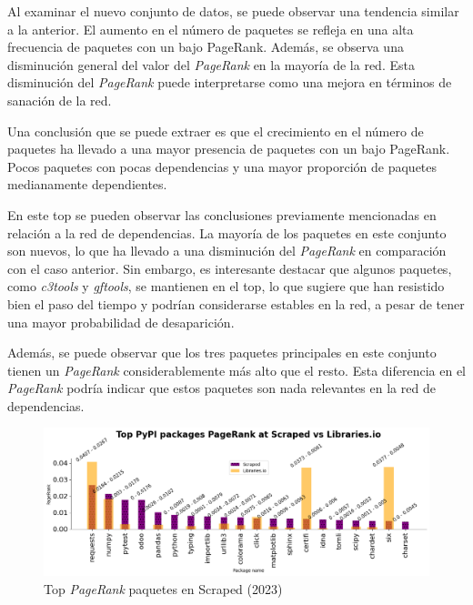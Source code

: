 Al examinar el nuevo conjunto de datos, se puede observar una tendencia similar a la anterior.
El aumento en el número de paquetes se refleja en una alta frecuencia de paquetes con un bajo
PageRank. Además, se observa una disminución general del valor del \textit{PageRank} en la mayoría de
la red. Esta disminución del \textit{PageRank} puede interpretarse como una mejora en términos de
sanación de la red.

Una conclusión que se puede extraer es que el crecimiento en el número de paquetes ha llevado
a una mayor presencia de paquetes con un bajo PageRank. Pocos paquetes con pocas dependencias y una mayor
proporción de paquetes medianamente dependientes.

En este top se pueden observar las conclusiones previamente mencionadas en relación a la red de
dependencias. La mayoría de los paquetes en este conjunto son nuevos, lo que ha llevado a una
disminución del \textit{PageRank} en comparación con el caso anterior. Sin embargo, es
interesante destacar que algunos paquetes, como \textit{c3tools} y
\textit{gftools},
se mantienen en el top, lo que sugiere que han resistido bien el paso del tiempo y podrían
considerarse estables en la red, a pesar de tener una mayor probabilidad de
desaparición.

Además, se puede observar que los tres paquetes principales en este conjunto tienen
un \textit{PageRank} considerablemente más alto que el resto. Esta diferencia en
el \textit{PageRank} podría indicar que estos paquetes son nada relevantes
en la red de dependencias.

\begin{figure}[ht!]
    \begin{center}
        \includegraphics[width=1\textwidth]{img/pypi/t20_pkg_pr_scr.png}
        \caption{Top \textit{PageRank} paquetes en Scraped (2023)}
        \label{fig:Top PageRank paquetes en Scraped}
    \end{center}
\end{figure}

